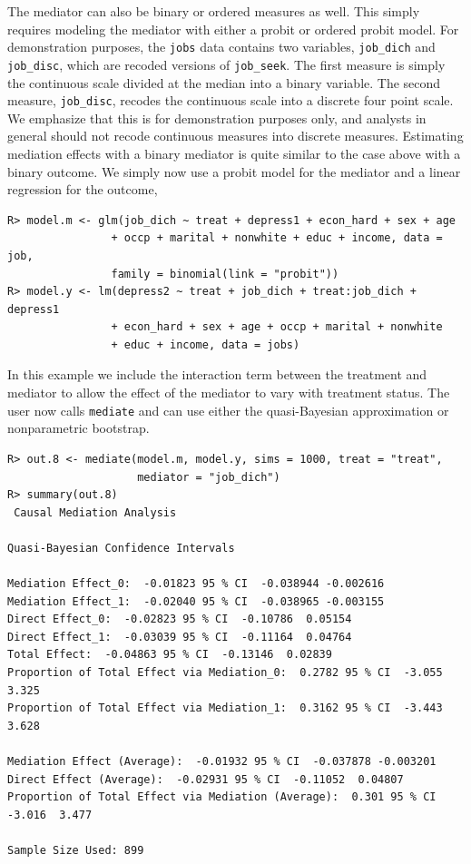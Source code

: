 \documentclass[11pt,letterpaper]{article}
\theoremstyle{plain}
\begin{document}
The mediator can also be binary or ordered measures as well.  This
simply requires modeling the mediator with either a probit or ordered
probit model.  For demonstration purposes, the \texttt{jobs} data
contains two variables, \texttt{job\_dich} and \texttt{job\_disc},
which are recoded versions of \texttt{job\_seek}.  The first measure
is simply the continuous scale divided at the median into a binary
variable.  The second measure, \texttt{job\_disc}, recodes the
continuous scale into a discrete four point scale.  We emphasize that
this is for demonstration purposes only, and analysts in general
should not recode continuous measures into discrete measures.
Estimating mediation effects with a binary mediator is quite similar
to the case above with a binary outcome.  We simply now use a probit
model for the mediator and a linear regression for the outcome,
\begin{verbatim}
R> model.m <- glm(job_dich ~ treat + depress1 + econ_hard + sex + age
                + occp + marital + nonwhite + educ + income, data = job, 
                family = binomial(link = "probit"))
R> model.y <- lm(depress2 ~ treat + job_dich + treat:job_dich + depress1
                + econ_hard + sex + age + occp + marital + nonwhite 
                + educ + income, data = jobs)
\end{verbatim}

In this example we include the interaction term between the treatment and
mediator to allow the effect of the mediator to vary with
treatment status.  The user now calls \texttt{mediate} and can use
either the quasi-Bayesian approximation or nonparametric bootstrap.
\begin{verbatim}
R> out.8 <- mediate(model.m, model.y, sims = 1000, treat = "treat",
                    mediator = "job_dich")
R> summary(out.8)
 Causal Mediation Analysis 

Quasi-Bayesian Confidence Intervals

Mediation Effect_0:  -0.01823 95 % CI  -0.038944 -0.002616 
Mediation Effect_1:  -0.02040 95 % CI  -0.038965 -0.003155 
Direct Effect_0:  -0.02823 95 % CI  -0.10786  0.05154 
Direct Effect_1:  -0.03039 95 % CI  -0.11164  0.04764 
Total Effect:  -0.04863 95 % CI  -0.13146  0.02839 
Proportion of Total Effect via Mediation_0:  0.2782 95 % CI  -3.055  3.325 
Proportion of Total Effect via Mediation_1:  0.3162 95 % CI  -3.443  3.628 

Mediation Effect (Average):  -0.01932 95 % CI  -0.037878 -0.003201 
Direct Effect (Average):  -0.02931 95 % CI  -0.11052  0.04807 
Proportion of Total Effect via Mediation (Average):  0.301 95 % CI  -3.016  3.477 

Sample Size Used: 899 
\end{verbatim}
\end{document}
